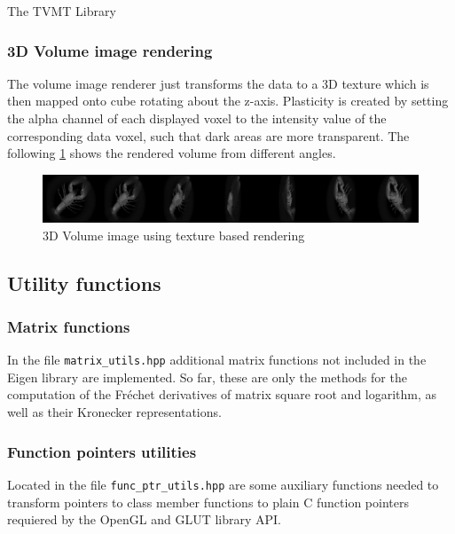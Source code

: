 \begin{chapter}{The TVMT Library}
\subsubsection{3D Volume image rendering} %
\label{ssub:3D Volume image rendering}
The volume image renderer just transforms the data to a 3D texture which is then mapped onto cube rotating about the z-axis.
Plasticity is created by setting the alpha channel of each displayed voxel to the intensity value of the corresponding data voxel, such that dark areas are more transparent.
The following \ref{fig:volume_visualization} shows the rendered volume from different angles.
\begin{figure}[h!]
        \centering
	    \includegraphics[width=1.0\linewidth]{./figures/library/3dvol_seq.png}
	    \caption[3D Volume image renderer]{3D Volume image using texture based rendering }
	\label{fig:volume_visualization}
\end{figure}


\subsection{Utility functions} %
\label{sub:Utility function}

\subsubsection{Matrix functions} %
\label{ssub:Matrix functions}
In the file \texttt{matrix\_utils.hpp} additional matrix functions not included in the Eigen library are implemented.
So far, these are only the methods for the computation of the Fr\'{e}chet derivatives of matrix square root and logarithm, as well as their
Kronecker representations.


\subsubsection{Function pointers utilities} %
\label{ssub:Function pointers}
Located in the file \texttt{func\_ptr\_utils.hpp} are some auxiliary functions needed to transform pointers to class member functions
to plain C function pointers requiered by the OpenGL and GLUT library API.


\end{chapter}
